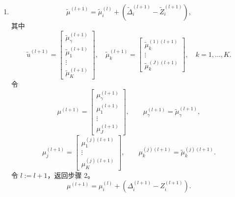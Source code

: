 \begin{enumerate}[label=步骤 \arabic*：,leftmargin=4.8em]
\[\]
\[
\widetilde Z_{ki}^{(l+1)}
=\left(-\frac{\lambda\sqrt J}{\rho\lVert\widetilde\Delta_{ki}^{(l+1)}-\mu_{ki}^{(l)}\rVert_2}\right)_+
(\widetilde\Delta_{ki}^{(l+1)}-\mu_{ki}^{(l)}),\quad k=1,\ldots,K.
\]
\[
\widetilde Z_{ki}^{(l+1)}=\begin{bmatrix}\widetilde Z_{\gamma i}^{(l+1)}\\\widetilde Z_{1i}^{(l+1)}\\\vdots\\\widetilde Z_{Ki}^{(l+1)}\end{bmatrix},\qquad
\widetilde Z_{ki}^{(l+1)}=\begin{bmatrix}\widetilde Z_{ki}^{(1)(l+1)}\\\vdots\\\widetilde Z_{ki}^{(J)(l+1)}\end{bmatrix}.
\]
令
\[
Z_{ki}^{(j)(l+1)}=\widetilde Z_{ki}^{(j)(l+1)},\qquad
Z_{\gamma i}^{(l+1)}=\widetilde Z_{\gamma i}^{(l+1)},
\]
\[
Z_i^{(j)(l+1)}=\begin{bmatrix}Z_{1i}^{(j)(l+1)}\\\vdots\\Z_{Ki}^{(j)(l+1)}\end{bmatrix},\qquad
Z_i^{(l+1)}=\begin{bmatrix}Z_{\gamma i}^{(l+1)}\\Z_i^{(1)(l+1)}\\\vdots\\Z_i^{(J)(l+1)}\end{bmatrix}.
\]
\item
\[
\widetilde\mu^{(l+1)}=\widetilde\mu_i^{(l)}
+(\widetilde\Delta_i^{(l+1)}-\widetilde Z_i^{(l+1)}),
\]
其中
\[
\widetilde u^{(l+1)}=\begin{bmatrix}\widetilde\mu_\gamma^{(l+1)}\\\widetilde\mu_1^{(l+1)}\\\vdots\\\widetilde\mu_K^{(l+1)}\end{bmatrix},\quad
\widetilde\mu_k^{(l+1)}=\begin{bmatrix}\widetilde\mu_k^{(1)(l+1)}\\\vdots\\\widetilde\mu_k^{(J)(l+1)}\end{bmatrix},\quad k=1,\ldots,K.
\]
令
\[
\mu^{(l+1)}=\begin{bmatrix}\mu_\gamma^{(l+1)}\\\mu_1^{(l+1)}\\\vdots\\\mu_J^{(l+1)}\end{bmatrix},\qquad
\mu_\gamma^{(l+1)}=\widetilde\mu_\gamma^{(l+1)},
\]
\[
\mu_j^{(l+1)}=\begin{bmatrix}\mu_1^{(j)(l+1)}\\\vdots\\\mu_K^{(j)(l+1)}\end{bmatrix},\qquad
\mu_k^{(j)(l+1)}=\widetilde\mu_k^{(j)(l+1)}.
\]
令 $l:=l+1$，返回步骤 2。
\[
\mu^{(l+1)}=\mu_i^{(l)}+(\Delta_i^{(l+1)}-Z_i^{(l+1)}).
\]
\end{enumerate}

